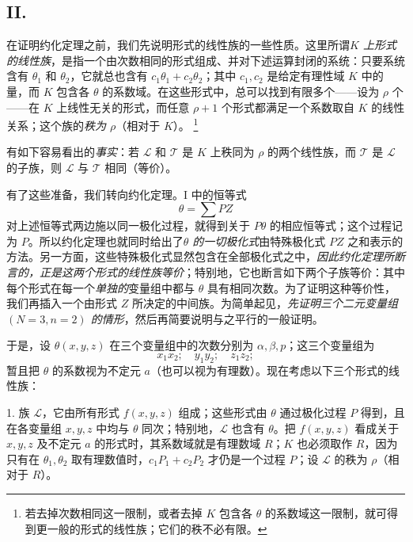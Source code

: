 \documentclass[11pt]{article}
\providecommand{\NoetherSrcNote}[2]{%
  \begingroup\renewcommand{\thefootnote}{#1}\footnote{#2}\addtocounter{footnote}{-1}\endgroup}
\begin{document}
\subsection*{II.}
在证明约化定理之前，我们先说明形式的线性族的一些性质。这里所谓\emph{$K$ 上形式的线性族}，是指一个由次数相同的形式组成、并对下述运算封闭的系统：只要系统含有 $\theta_1$ 和 $\theta_2$，它就总也含有 $c_1\theta_1+c_2\theta_2$；其中 $c_1,c_2$ 是给定有理性域 $K$ 中的量，而 $K$ 包含各 $\theta$ 的系数域。在这些形式中，总可以找到有限多个——设为 $\rho$ 个——在 $K$ 上线性无关的形式，而任意 $\rho+1$ 个形式都满足一个系数取自 $K$ 的线性关系；这个族的\emph{秩为 $\rho$}（相对于 $K$）。\NoetherSrcNote{*)}{若去掉次数相同这一限制，或者去掉 $K$ 包含各 $\theta$ 的系数域这一限制，就可得到更一般的形式的线性族；它们的秩不必有限。}有如下容易看出的\emph{事实}：若 $\mathcal L$ 和 $\mathcal T$ 是 $K$ 上秩同为 $\rho$ 的两个线性族，而 $\mathcal T$ 是 $\mathcal L$ 的子族，则 $\mathcal L$ 与 $\mathcal T$ 相同（等价）。

有了这些准备，我们转向约化定理。I 中的恒等式
\[
  \theta=\sum PZ
\]
对上述恒等式两边施以同一极化过程，就得到关于 $P\theta$ 的相应恒等式；这个过程记为 $P$。所以约化定理也就同时给出了\emph{$\theta$ 的一切极化式}由特殊极化式 $PZ$ 之和表示的方法。另一方面，这些特殊极化式显然包含在全部极化式之中，\emph{因此约化定理所断言的，正是这两个形式的线性族等价}；特别地，它也断言如下两个子族等价：其中每个形式在每一个\emph{单独的}变量组中都与 $\theta$ 具有相同次数。为了证明这种等价性，我们再插入一个由形式 $Z$ 所决定的中间族。为简单起见，\emph{先证明三个二元变量组 $(N=3,n=2)$ 的情形}，然后再简要说明与之平行的一般证明。

于是，设 $\theta(x,y,z)$ 在三个变量组中的次数分别为 $\alpha,\beta,p$；这三个变量组为
\[
  x_1x_2;\quad y_1y_2;\quad z_1z_2;
\]
暂且把 $\theta$ 的系数视为不定元 $a$（也可以视为有理数）。现在考虑以下三个形式的线性族：

1. 族 $\mathcal L$，它由所有形式 $f(x,y,z)$ 组成；这些形式由 $\theta$ 通过极化过程 $P$ 得到，且在各变量组 $x,y,z$ 中均与 $\theta$ 同次；特别地，$\mathcal L$ 也含有 $\theta$。把 $f(x,y,z)$ 看成关于 $x,y,z$ 及不定元 $a$ 的形式时，其系数域就是有理数域 $R$；$K$ 也必须取作 $R$，因为只有在 $\theta_1,\theta_2$ 取有理数值时，$c_1P_1+c_2P_2$ 才仍是一个过程 $P$；设 $\mathcal L$ 的秩为 $\rho$（相对于 $R$）。
\end{document}
